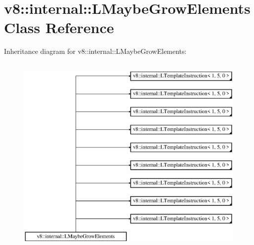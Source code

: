 \hypertarget{classv8_1_1internal_1_1_l_maybe_grow_elements}{}\section{v8\+:\+:internal\+:\+:L\+Maybe\+Grow\+Elements Class Reference}
\label{classv8_1_1internal_1_1_l_maybe_grow_elements}
Inheritance diagram for v8\+:\+:internal\+:\+:L\+Maybe\+Grow\+Elements\+:\begin{figure}[H]
\begin{center}
\leavevmode
\includegraphics[height=10.000000cm]{classv8_1_1internal_1_1_l_maybe_grow_elements}
\end{center}
\end{figure}
